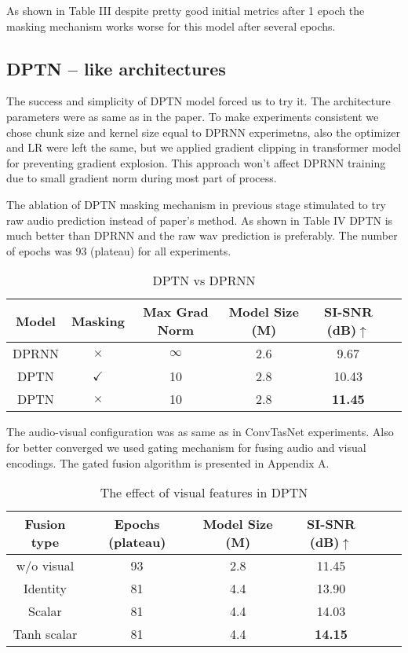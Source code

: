 \documentclass[10pt,conference,compsocconf]{IEEEtran}
\begin{document}
 As shown in Table III despite pretty good initial metrics after 1 epoch the masking mechanism works worse for this model after several epochs.

\subsection{\textbf{DPTN -- like architectures}}
The success and simplicity of DPTN model forced us to try it. The architecture parameters were as same as in the paper. To make experiments consistent we chose chunk size and kernel size equal to DPRNN experimetns, also the optimizer and LR were left the same, but we applied gradient clipping in transformer model for preventing gradient explosion. This approach won't affect DPRNN training due to small gradient norm during most part of process.

The ablation of DPTN masking mechanism in previous stage stimulated to try raw audio prediction instead of paper's method.
As shown in Table IV DPTN is much better than DPRNN and the raw wav prediction is preferably. The number of epochs was 93 (plateau) for all experiments.

\begin{table}[H]
\centering
\caption{DPTN vs DPRNN}
\begin{tabular}{|c|c|c|c|c|c|}
\hline
Model &Masking & Max Grad Norm & Model Size (M) & SI-SNR (dB)$\uparrow$ \\ \hline
 DPRNN & $ \times$ & $\infty$ & 2.6 & 9.67 \\ \hline
 DPTN & $ \checkmark $ & 10 & 2.8 & 10.43 \\ \hline
 DPTN & $ \times $ & 10 & 2.8 & \textbf{11.45} \\ \hline
\end{tabular}
\end{table}

The audio-visual configuration was as same as in ConvTasNet experiments. Also for better converged we used gating mechanism for fusing audio and visual encodings. The gated fusion algorithm is presented in Appendix A.

\begin{table}[H]
\centering
\caption{The effect of visual features in DPTN}
\begin{tabular}{|c|c|c|c|c|c|}
\hline
Fusion type & Epochs (plateau) & Model Size (M) & SI-SNR (dB)$\uparrow$ \\ \hline
 w/o visual & 93 & 2.8 & 11.45 \\ \hline
 Identity & 81 & 4.4 & 13.90 \\ \hline
 Scalar & 81 & 4.4 & 14.03 \\ \hline
 Tanh scalar & 81 & 4.4 & \textbf{14.15} \\ \hline
\end{tabular}
\end{table}
\end{document}
